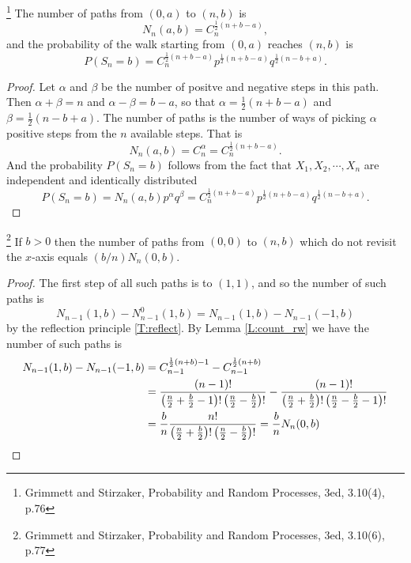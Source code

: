 \begin{lemma} \label{L:count_rw}
\footnote{Grimmett and Stirzaker, Probability and Random Processes, 3ed, 
          3.10(4), p.76}
The number of paths from $(0,a)$ to $(n,b)$ is 
\begin{equation}
  N_n(a,b) = C_n^{\frac{1}{2}(n+b-a)}, 
\end{equation}
and the probability of the walk starting from $(0,a)$ reaches $(n,b)$ is 
\begin{equation}
  P(S_n=b) = C_n^{\frac{1}{2}(n+b-a)} 
               p^{\frac{1}{2} (n+b-a)} q^{\frac{1}{2} (n-b+a)}.
\end{equation}
\end{lemma}
\begin{proof}
Let $\alpha$ and $\beta$ be the number of positve and negative steps in this
path. Then $\alpha+\beta=n$ and $\alpha-\beta=b-a$, so that 
$\alpha = \frac{1}{2}(n+b-a)$ and $\beta = \frac{1}{2}(n-b+a)$. 
The number of paths is the number of ways of
picking $\alpha$ positive steps from the $n$ available steps. That is
\[
  N_n(a,b) = C_n^{\alpha} = C_n^{\frac{1}{2}(n+b-a)}.
\]
And the probability $P(S_n=b)$ follows from the fact that 
$X_1,X_2,\cdots,X_n$
are independent and identically distributed
\[
  P(S_n=b) = N_n(a,b) p^{\alpha} q^{\beta}
           = C_n^{\frac{1}{2}(n+b-a)} 
               p^{\frac{1}{2} (n+b-a)} q^{\frac{1}{2} (n-b+a)}.
\]
\end{proof}

\begin{corollary} \label{C:ballot}
\footnote{Grimmett and Stirzaker, Probability and Random Processes, 3ed, 
          3.10(6), p.77}
If $b>0$ then the number of paths from $(0,0)$ to $(n,b)$ which do not revisit
the $x$-axis equals $(b/n)N_n(0,b)$.
\end{corollary}
\begin{proof}
The first step of all such paths is to $(1,1)$, and so the number of such 
paths is
\[
  N_{n-1}(1,b) - N_{n-1}^0(1,b) = N_{n-1}(1,b) - N_{n-1}(-1,b)
\]
by the reflection principle \ref{T:reflect}. By Lemma \ref{L:count_rw} we 
have the number of such paths is
\begin{align*}
   N_{n-1}(1,b) - N_{n-1}(-1,b) 
     &= C_{n-1}^{\frac{1}{2}(n+b)-1} - C_{n-1}^{\frac{1}{2}(n+b)} \notag \\
     &= \frac{(n-1)!}{\left(\frac{n}{2}+\frac{b}{2}-1\right)!
                      \left(\frac{n}{2}-\frac{b}{2}\right)!}
      - \frac{(n-1)!}{\left(\frac{n}{2}+\frac{b}{2}\right)!
                      \left(\frac{n}{2}-\frac{b}{2}-1\right)!}    \notag \\
     &= \frac{b}{n} \frac{n!}{\left(\frac{n}{2}+\frac{b}{2}\right)!
                              \left(\frac{n}{2}-\frac{b}{2}\right)!}
        = \frac{b}{n} N_n(0,b)  \notag
\end{align*}
\end{proof}

